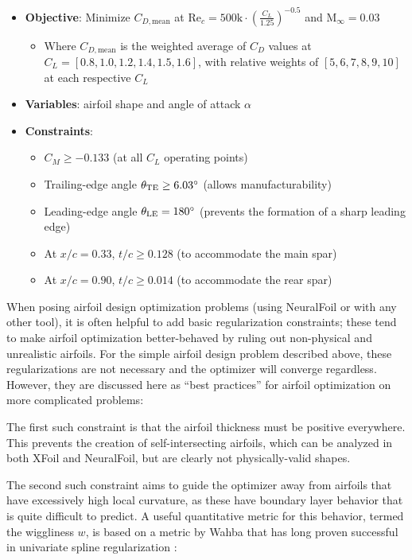 \documentclass[conf]{new-aiaa}
\begin{document}
    \begin{itemize}
        \item \textbf{Objective}: Minimize $C_{D, \mathrm{mean}}$ at $\mathrm{Re}_c = 500\mathrm{k} \cdot \left(\frac{C_L}{1.25}\right)^{-0.5}$ and $\mathrm{M}_\infty = 0.03$
        \begin{itemize}
            \item Where $C_{D, \mathrm{mean}}$ is the weighted average of $C_D$ values at $C_L = [0.8, 1.0, 1.2, 1.4, 1.5, 1.6]$, with relative weights of $[5, 6, 7, 8, 9, 10]$ at each respective $C_L$
        \end{itemize}
        \item \textbf{Variables}: airfoil shape and angle of attack $\alpha$
        \item \textbf{Constraints}:
        \begin{itemize}
            \item $C_M \geq -0.133$ (at all $C_L$ operating points)
            \item Trailing-edge angle $\theta_{\rm TE} \geq 6.03^\circ$ (allows manufacturability)
            \item Leading-edge angle $\theta_{\rm LE} = 180^\circ$ (prevents the formation of a sharp leading edge)
            \item At $x/c = 0.33$, $t/c \geq 0.128$ (to accommodate the main spar)
            \item At $x/c = 0.90$, $t/c \geq 0.014$ (to accommodate the rear spar)
        \end{itemize}
    \end{itemize}

    When posing airfoil design optimization problems (using NeuralFoil or with any other tool), it is often helpful to add basic regularization constraints; these tend to make airfoil optimization better-behaved by ruling out non-physical and unrealistic airfoils. For the simple airfoil design problem described above, these regularizations are not necessary and the optimizer will converge regardless. However, they are discussed here as ``best practices'' for airfoil optimization on more complicated problems:

    The first such constraint is that the airfoil thickness must be positive everywhere. This prevents the creation of self-intersecting airfoils, which can be analyzed in both XFoil and NeuralFoil, but are clearly not physically-valid shapes.

    The second such constraint aims to guide the optimizer away from airfoils that have excessively high local curvature, as these have boundary layer behavior that is quite difficult to predict. A useful quantitative metric for this behavior, termed the wiggliness $w$, is based on a metric by Wahba that has long proven successful in univariate spline regularization \cite{wahba_spline_2007}:
\end{document}
